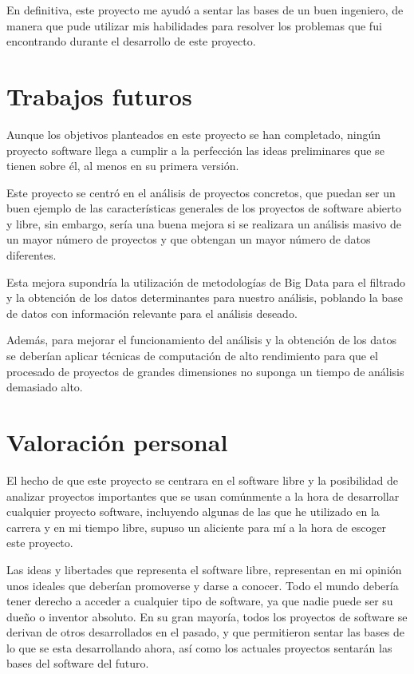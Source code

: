 \documentclass[a4paper, spanish, 12pt]{book}
\begin{document}
En definitiva, este proyecto me ayud\'o a sentar las bases de un buen ingeniero, de manera que
pude utilizar mis habilidades para resolver los problemas que fui encontrando durante
el desarrollo de este proyecto.

\section{Trabajos futuros}
\label{sec:trabajos_futuros}

Aunque los objetivos planteados en este proyecto se han completado, ning\'un
proyecto software llega a cumplir a la perfecci\'on las ideas preliminares que se
tienen sobre \'el, al menos en su primera versi\'on.

Este proyecto se centr\'o en el an\'alisis de proyectos concretos, que puedan ser
un buen ejemplo de las caracter\'isticas generales de los proyectos de software abierto
y libre, sin embargo, ser\'ia una buena mejora si se realizara un an\'alisis masivo
de un mayor n\'umero de proyectos y que obtengan un mayor n\'umero de datos diferentes.

Esta mejora supondr\'ia la utilizaci\'on de metodolog\'ias de Big Data para el filtrado
y la obtenci\'on de los datos determinantes para nuestro an\'alisis,
poblando la base de datos con informaci\'on relevante para el an\'alisis deseado.

Adem\'as, para mejorar el funcionamiento del an\'alisis y la obtenci\'on de los datos
se deber\'ian aplicar t\'ecnicas de computaci\'on de alto rendimiento para que
el procesado de proyectos de grandes dimensiones no suponga un tiempo de an\'alisis
demasiado alto.

\section{Valoraci\'on personal}
\label{sec:valoracion}

El hecho de que este proyecto se centrara en el software libre y la posibilidad
de analizar proyectos importantes que se usan com\'unmente a la hora de desarrollar cualquier
proyecto software, incluyendo algunas de las que he utilizado en la carrera y en mi tiempo
libre, supuso un aliciente para m\'i a la hora de escoger este proyecto.

Las ideas y libertades que representa el software libre, representan en mi opini\'on
unos ideales que deber\'ian promoverse y darse a conocer. Todo el mundo deber\'ia
tener derecho a acceder a cualquier tipo de software, ya que nadie puede ser su due\~no o inventor
absoluto. En su gran mayor\'ia, todos los proyectos de software
se derivan de otros desarrollados en el pasado, y que permitieron sentar las bases de lo que
se esta desarrollando ahora, as\'i como los actuales proyectos sentar\'an las bases
del software del futuro.
\end{document}
